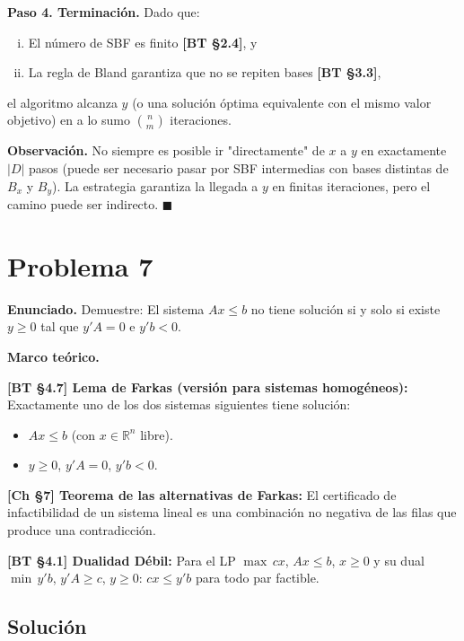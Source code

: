 \documentclass{article}
\newenvironment{marco}{\begin{mdframed}[linecolor=black!40,backgroundcolor=gray!5]\small\textbf{Marco teórico.}\par\smallskip}{\end{mdframed}\medskip}
\begin{document}
\textbf{Paso 4. Terminación.} Dado que:
\begin{enumerate}[(i)]
  \item El número de SBF es finito \textbf{[BT §2.4]}, y
  \item La regla de Bland garantiza que no se repiten bases \textbf{[BT §3.3]},
\end{enumerate}
el algoritmo alcanza $y$ (o una solución óptima equivalente con el mismo valor objetivo) en a lo sumo $\binom{n}{m}$ iteraciones.

\medskip
\textbf{Observación.} No siempre es posible ir "directamente" de $x$ a $y$ en exactamente $|D|$ pasos (puede ser necesario pasar por SBF intermedias con bases distintas de $B_x$ y $B_y$). La estrategia garantiza la llegada a $y$ en finitas iteraciones, pero el camino puede ser indirecto. $\blacksquare$

\section*{Problema 7}

\textbf{Enunciado.} Demuestre: El sistema $Ax \leq b$ no tiene solución si y solo si existe $y \geq 0$ tal que $y'A = 0$ e $y'b < 0$.

\begin{marco}
\textbf{[BT §4.7] Lema de Farkas (versión para sistemas homogéneos):} Exactamente uno de los dos sistemas siguientes tiene solución:
\begin{itemize}
  \item[(I)] $Ax \leq b$ (con $x \in \mathbb{R}^n$ libre).
  \item[(II)] $y \geq 0$, $y'A = 0$, $y'b < 0$.
\end{itemize}

\textbf{[Ch §7] Teorema de las alternativas de Farkas:} El certificado de infactibilidad de un sistema lineal es una combinación no negativa de las filas que produce una contradicción.

\textbf{[BT §4.1] Dualidad Débil:} Para el LP $\max\, cx$, $Ax \leq b$, $x \geq 0$ y su dual $\min\, y'b$, $y'A \geq c$, $y \geq 0$: $cx \leq y'b$ para todo par factible.
\end{marco}

\subsection*{Solución}
\end{document}
